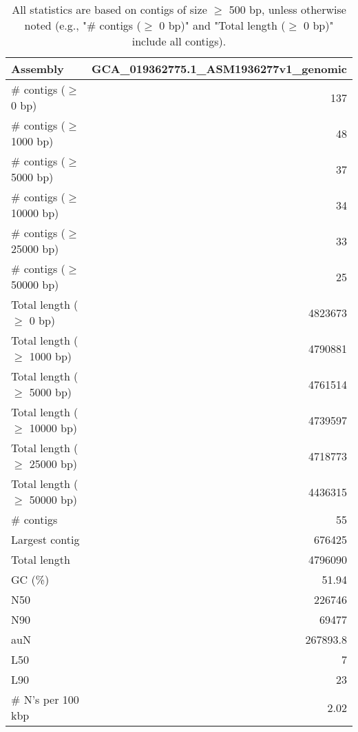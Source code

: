 \documentclass[12pt,a4paper]{article}
\begin{document}
\begin{table}[ht]
\begin{center}
\caption{All statistics are based on contigs of size $\geq$ 500 bp, unless otherwise noted (e.g., "\# contigs ($\geq$ 0 bp)" and "Total length ($\geq$ 0 bp)" include all contigs).}
\begin{tabular}{|l*{1}{|r}|}
\hline
Assembly & GCA\_019362775.1\_ASM1936277v1\_genomic \\ \hline
\# contigs ($\geq$ 0 bp) & 137 \\ \hline
\# contigs ($\geq$ 1000 bp) & 48 \\ \hline
\# contigs ($\geq$ 5000 bp) & 37 \\ \hline
\# contigs ($\geq$ 10000 bp) & 34 \\ \hline
\# contigs ($\geq$ 25000 bp) & 33 \\ \hline
\# contigs ($\geq$ 50000 bp) & 25 \\ \hline
Total length ($\geq$ 0 bp) & 4823673 \\ \hline
Total length ($\geq$ 1000 bp) & 4790881 \\ \hline
Total length ($\geq$ 5000 bp) & 4761514 \\ \hline
Total length ($\geq$ 10000 bp) & 4739597 \\ \hline
Total length ($\geq$ 25000 bp) & 4718773 \\ \hline
Total length ($\geq$ 50000 bp) & 4436315 \\ \hline
\# contigs & 55 \\ \hline
Largest contig & 676425 \\ \hline
Total length & 4796090 \\ \hline
GC (\%) & 51.94 \\ \hline
N50 & 226746 \\ \hline
N90 & 69477 \\ \hline
auN & 267893.8 \\ \hline
L50 & 7 \\ \hline
L90 & 23 \\ \hline
\# N's per 100 kbp & 2.02 \\ \hline
\end{tabular}
\end{center}
\end{table}
\end{document}
